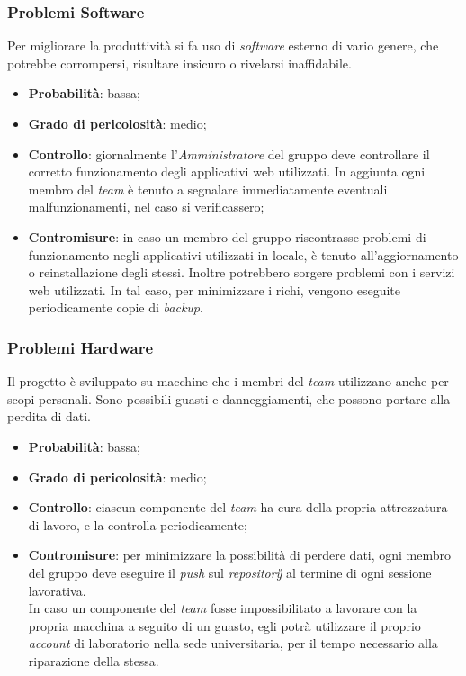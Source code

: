 \subsubsection{Problemi Software}
\label{sec:PSW}
Per migliorare la produttività si fa uso di \textit{software} esterno di vario genere, che potrebbe corrompersi, risultare insicuro o rivelarsi inaffidabile.
\begin{itemize}
\item \textbf{Probabilità}: bassa;
\item \textbf{Grado di pericolosità}: medio;
\item \textbf{Controllo}: giornalmente l'\textit{Amministratore} del gruppo deve controllare il corretto funzionamento degli applicativi web utilizzati. In aggiunta ogni membro del \textit{team} è tenuto a segnalare immediatamente eventuali malfunzionamenti, nel caso si verificassero;
\item \textbf{Contromisure}: in caso un membro del gruppo riscontrasse problemi di funzionamento negli applicativi utilizzati in locale, è tenuto all'aggiornamento o reinstallazione degli stessi. Inoltre potrebbero sorgere problemi con i servizi web utilizzati. In tal caso, per minimizzare i richi, vengono eseguite periodicamente copie di \textit{backup}.
\end{itemize}

\subsubsection{Problemi Hardware}
\label{sec:PHW}
Il progetto è sviluppato su macchine che i membri del \textit{team} utilizzano anche per scopi personali. Sono possibili guasti e danneggiamenti, che possono portare alla perdita di dati.
\begin{itemize}
\item \textbf{Probabilità}: bassa;
\item \textbf{Grado di pericolosità}: medio;
\item \textbf{Controllo}: ciascun componente del \textit{team} ha cura della propria attrezzatura di lavoro, e la controlla periodicamente;
\item \textbf{Contromisure}: per minimizzare la possibilità di perdere dati, ogni membro del gruppo deve eseguire il \textit{push} sul \textit{repository\G} al termine di ogni sessione lavorativa. \\
In caso un componente del \textit{team} fosse impossibilitato a lavorare con la propria macchina a seguito di un guasto, egli potrà utilizzare il proprio \textit{account} di laboratorio nella sede universitaria, per il tempo necessario alla riparazione della stessa.
\end{itemize}

